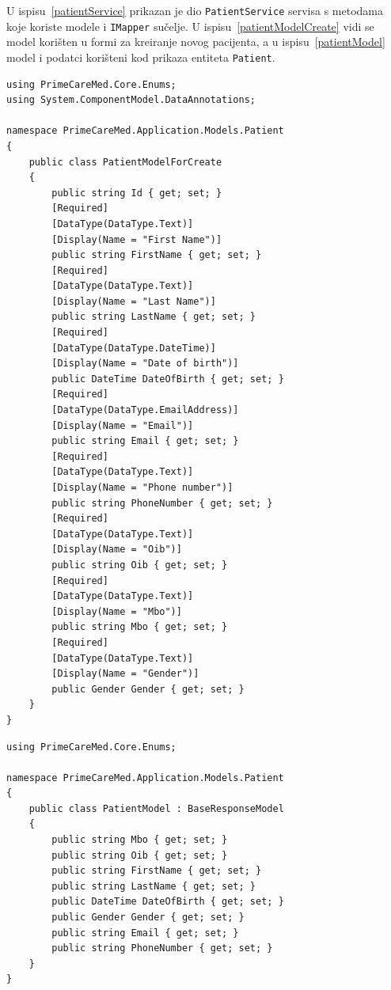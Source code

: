 U ispisu~\ref{patientService} prikazan je dio \texttt{PatientService} servisa s metodama koje koriste modele i \texttt{IMapper} sučelje. U ispisu~\ref{patientModelCreate} vidi se model korišten u formi za kreiranje novog pacijenta, a u ispisu~\ref{patientModel} model i podatci korišteni kod prikaza entiteta \texttt{Patient}.
\begin{lstlisting}[caption={\texttt{PatientModelForCreate} model}, label=patientModelCreate]
using PrimeCareMed.Core.Enums;
using System.ComponentModel.DataAnnotations;

namespace PrimeCareMed.Application.Models.Patient
{
    public class PatientModelForCreate
    {
        public string Id { get; set; }
        [Required]
        [DataType(DataType.Text)]
        [Display(Name = "First Name")]
        public string FirstName { get; set; }
        [Required]
        [DataType(DataType.Text)]
        [Display(Name = "Last Name")]
        public string LastName { get; set; }
        [Required]
        [DataType(DataType.DateTime)]
        [Display(Name = "Date of birth")]
        public DateTime DateOfBirth { get; set; }
        [Required]
        [DataType(DataType.EmailAddress)]
        [Display(Name = "Email")]
        public string Email { get; set; }
        [Required]
        [DataType(DataType.Text)]
        [Display(Name = "Phone number")]
        public string PhoneNumber { get; set; }
        [Required]
        [DataType(DataType.Text)]
        [Display(Name = "Oib")]
        public string Oib { get; set; }
        [Required]
        [DataType(DataType.Text)]
        [Display(Name = "Mbo")]
        public string Mbo { get; set; }
        [Required]
        [DataType(DataType.Text)]
        [Display(Name = "Gender")]
        public Gender Gender { get; set; }
    }
}
\end{lstlisting}

\begin{lstlisting}[caption={\texttt{PatientModel} model}, label=patientModel]
using PrimeCareMed.Core.Enums;

namespace PrimeCareMed.Application.Models.Patient
{
    public class PatientModel : BaseResponseModel
    {
        public string Mbo { get; set; }
        public string Oib { get; set; }
        public string FirstName { get; set; }
        public string LastName { get; set; }
        public DateTime DateOfBirth { get; set; }
        public Gender Gender { get; set; }
        public string Email { get; set; }
        public string PhoneNumber { get; set; }
    }
}
\end{lstlisting}

